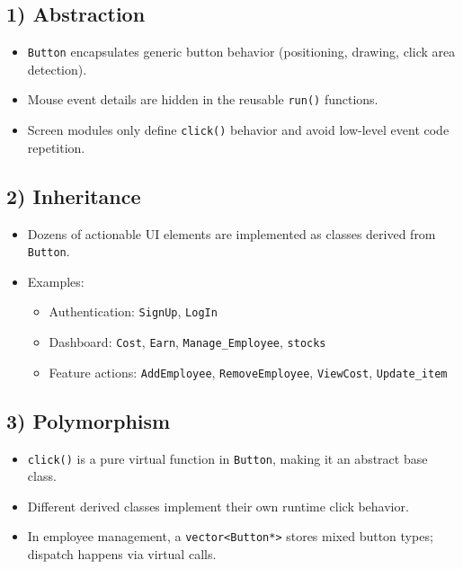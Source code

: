 \documentclass[12pt,a4paper]{article}
\begin{document}
\subsection{1) Abstraction}
\begin{itemize}[leftmargin=1.4em]
    \item \texttt{Button} encapsulates generic button behavior (positioning, drawing, click area detection).
    \item Mouse event details are hidden in the reusable \texttt{run()} functions.
    \item Screen modules only define \texttt{click()} behavior and avoid low-level event code repetition.
\end{itemize}

\subsection{2) Inheritance}
\begin{itemize}[leftmargin=1.4em]
    \item Dozens of actionable UI elements are implemented as classes derived from \texttt{Button}.
    \item Examples:
    \begin{itemize}[leftmargin=1.4em]
        \item Authentication: \texttt{SignUp}, \texttt{LogIn}
        \item Dashboard: \texttt{Cost}, \texttt{Earn}, \texttt{Manage\_Employee}, \texttt{stocks}
        \item Feature actions: \texttt{AddEmployee}, \texttt{RemoveEmployee}, \texttt{ViewCost}, \texttt{Update\_item}
    \end{itemize}
\end{itemize}

\subsection{3) Polymorphism}
\begin{itemize}[leftmargin=1.4em]
    \item \texttt{click()} is a pure virtual function in \texttt{Button}, making it an abstract base class.
    \item Different derived classes implement their own runtime click behavior.
    \item In employee management, a \texttt{vector<Button*>} stores mixed button types; dispatch happens via virtual calls.
\end{itemize}
\end{document}
